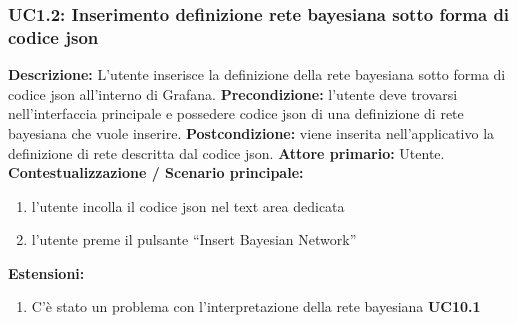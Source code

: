                 \subsubsection{UC1.2: Inserimento definizione rete bayesiana sotto forma di codice json}
                	\textbf{Descrizione:} L'utente inserisce la definizione della rete bayesiana sotto forma di codice json all'interno di Grafana.
                    \textbf{Precondizione:}  l’utente deve trovarsi nell’interfaccia principale e possedere codice json di una definizione di rete bayesiana che vuole inserire.
                    \newline
                    \textbf{Postcondizione:} viene inserita nell’applicativo la definizione di rete descritta dal codice json.
                    \newline
                    \textbf{Attore primario:} Utente.
                    \newline
                    \textbf{Contestualizzazione / Scenario principale:} \begin{enumerate}
                        \item l’utente incolla il codice json nel text area dedicata
                        \item l’utente preme il pulsante “Insert Bayesian Network”
                    \end{enumerate}
                    
                    \textbf{Estensioni:} \begin{enumerate}
                            \item C’è stato un problema con l’interpretazione della rete bayesiana \textbf{UC10.1}
                        \end{enumerate}
                        
